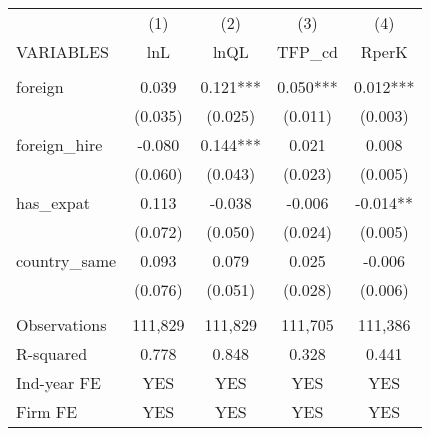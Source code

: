 \begin{tabular}{lcccc} \hline
 & (1) & (2) & (3) & (4) \\
VARIABLES & lnL & lnQL & TFP\_cd & RperK \\ \hline
 &  &  &  &  \\
foreign & 0.039 & 0.121*** & 0.050*** & 0.012*** \\
 & (0.035) & (0.025) & (0.011) & (0.003) \\
foreign\_hire & -0.080 & 0.144*** & 0.021 & 0.008 \\
 & (0.060) & (0.043) & (0.023) & (0.005) \\
has\_expat & 0.113 & -0.038 & -0.006 & -0.014** \\
 & (0.072) & (0.050) & (0.024) & (0.005) \\
country\_same & 0.093 & 0.079 & 0.025 & -0.006 \\
 & (0.076) & (0.051) & (0.028) & (0.006) \\
 &  &  &  &  \\
Observations & 111,829 & 111,829 & 111,705 & 111,386 \\
R-squared & 0.778 & 0.848 & 0.328 & 0.441 \\
Ind-year FE & YES & YES & YES & YES \\
 Firm FE & YES & YES & YES & YES \\ \hline
\end{tabular}
